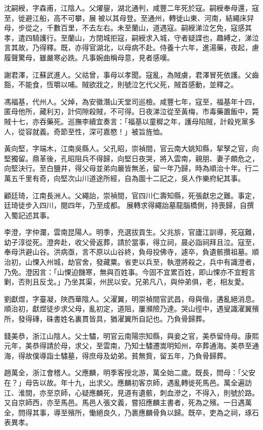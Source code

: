 \begin{pinyinscope}
沈嗣綬，字森甫，江陰人。父燿鋆，湖北通判，咸豐二年死於寇。嗣綬奉母還，寇至，徙避江船，高不可攀，展被以其母登。至通州，轉徙山東、河南，結繩床舁母，步從之，千數百里，不去左右。未至蘭山，道遇寇。嗣綬涕泣乞免，寇感其孝，遣四騎護行。至蘭山，方閉城拒寇，嗣綬求入城，守者疑諜也，趣縛之，涕泣言其故，乃得釋。既，亦得官湖北，以母病不赴。侍養十六年，進湯藥，夜起，慮履聲驚母，雖嚴寒必跣。凡事婉曲稱母意，見者感嘆。

謝君澤，江蘇武進人。父祜曾，事母以孝聞。寇亂，為賊虜，君澤冒死依護。父齒豁，不能食，恆嚼以哺。賊欲戕之，則號泣乞代父死，賊首感動，並釋之。

馮福基，代州人。父焯，為安徽潛山天堂司巡檢。咸豐七年，寇至，福基年十四，匿母他所，藏利刃，計伺隙殺賊，不可得。日夜涕泣從至黃梅，市毒藥置飯中，斃賊十七，亦吞藥死。巡撫李續宜奏言：「福基以童穉之年，護母陷賊，計殺兇黨多人，從容就義。奇節至性，深可嘉愍！」被旨旌恤。

黃向堅，字端木，江南吳縣人。父孔昭，崇禎間，官云南大姚知縣，挈孥之官，向堅獨留。鼎革後，孔昭阻兵不得歸，向堅日夜哭，將入雲南，親朋、妻子頗危之，向堅決行。至白鹽井，得父母並弟向嚴皆無恙，留一年乃歸，時為順治十年。行二萬五千里有奇，向堅次山川道途所經，自為圖十二記之，吳人作樂府紀其事。

顧廷琦，江南長洲人。父繩詒，崇禎間，官四川仁壽知縣，死張獻忠之難。事定，廷琦徒步入四川，閱四年，乃至成都。展轉求得繩詒墓龍腦橋側，持喪歸，自撰入蜀記述其事。

李澄，字仲瀾，雲南昆陽人。明季，充選拔貢生。父兆旂，官廬江訓導，死寇難，幼子淳從死。澄奔赴，收父骨返葬，請於當事，得立祠，晨必詣祠拜且泣。寇至，奉母洪避山谷。洪病亟，言不原以山谷終，負母投佛寺，遽卒，負遺骸攢祖墓。順治初，山惈入州城，劫官舍，發藏粟。省吏以兵至，執澄將殺之，兵中有識澄者，乃免。澄因言：「山惈迫饑寒，無與百姓事。今固不宜累百姓，即山惈亦不宜輕言剿，否則且反戈。」乃坐其渠，州民以安。兄弟凡八，與仲弟俱，老，相友愛。

劉獻煜，字臺凝，陜西華陰人。父濯翼，明崇禎間官武昌，母與偕，遘亂絕消息。順治初，獻煜徒步求父母，亂初定，道阻，屢瀕險乃達。哭山徑中，遇叟識濯翼殯所，發得磚，硃書姓名裏貫皆具，猶濯翼所自記也。乃負骨歸葬。

錢美恭，浙江山陰人。父士驌，明官云南陽宗知縣，與妾之官，美恭留侍母。康熙元年，美恭得請於母，求父，至雲南，乃知士驌遷嵩明知州，卒葬通海。美恭至通海，得故僕導詣士驌墓，得庶母及幼弟。貧無貲，留五年，乃負骨歸葬。

趙萬全，浙江會稽人。父應麟，明季客授北游，萬全始二歲。既長，問母：「父安在？」母告以故。年十九，出求父。應麟初客京師，遇亂轉徙死馬邑。萬全遍訪江、淮間，亦至京師，心疑應麟死，見道有遺骸，刺血滲之，不得入，則號於路。又自京師西，亦至馬邑。馬邑人張文義，嘗招應麟主書者，死為之殯。一日遇萬全，問得其事，導至殯所，慟絕良久，乃裹應麟骨負以歸。既卒，吏為之祠，琢石表異孝。


\end{pinyinscope}
